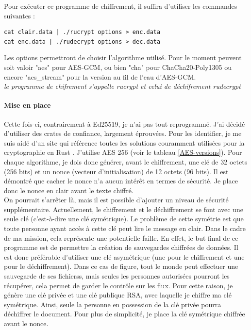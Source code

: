 \documentclass[a4paper, 12pt]{article}
\begin{document}
Pour exécuter ce programme de chiffrement, il suffira d'utiliser les commandes suivantes : 
\begin{verbatim}
cat clair.data | ./rucrypt options > enc.data
cat enc.data | ./rudecrypt options > dec.data
\end{verbatim}
Les options permettront de choisir l'algorithme utilisé. Pour le moment peuvent soit valoir "aes" pour AES-GCM, ou bien "cha" pour ChaCha20-Poly1305 ou encore "aes\_stream" pour la version au fil de l'eau d'AES-GCM.\\


\noindent\emph{le programme de chifrement s'appelle rucrypt et celui de déchifrement rudecrypt}

\paragraph{Mise en place}
Cette fois-ci, contrairement à Ed25519, je n'ai pas tout reprogrammé. J'ai décidé d'utiliser des crates de confiance, largement éprouvées. Pour les identifier, je me suis aidé d'un site qui référence toutes les solutions couramment utilisées pour la cryptographie en Rust \cite{bddrustcrypto}. J'utilise AES 256 (voir le tableau \ref{AES-versions}). Pour chaque algorithme, je dois donc générer, avant le chiffrement, une clé de 32 octets (256 bits) et un nonce (vecteur d'initialisation) de 12 octets (96 bits). Il est démontré que cacher le nonce n'a aucun intérêt en termes de sécurité. Je place donc le nonce en clair avant le texte chiffré. \\

On pourrait s'arrêter là, mais il est possible d'ajouter un niveau de sécurité supplémentaire. Actuellement, le chiffrement et le déchiffrement se font avec une seule clé (c'est-à-dire une clé symétrique). Le problème de cette symétrie est que toute personne ayant accès à cette clé peut lire le message en clair. Dans le cadre de ma mission, cela représente une potentielle faille. En effet, le but final de ce programme est de permettre la création de sauvegardes chiffrées de données. Il est donc préférable d'utiliser une clé asymétrique (une pour le chiffrement et une pour le déchiffrement). Dans ce cas de figure, tout le monde peut effectuer une sauvegarde de ses fichierss, mais seules les personnes autorisées pourront les récupérer, cela permet de garder le contrôle sur les flux. Pour cette raison, je génère une clé privée et une clé publique RSA, avec laquelle je chiffre ma clé symétrique. Ainsi, seule la personne en possession de la clé privée pourra déchiffrer le document. Pour plus de simplicité, je place la clé symétrique chiffrée avant le nonce.
\end{document}
